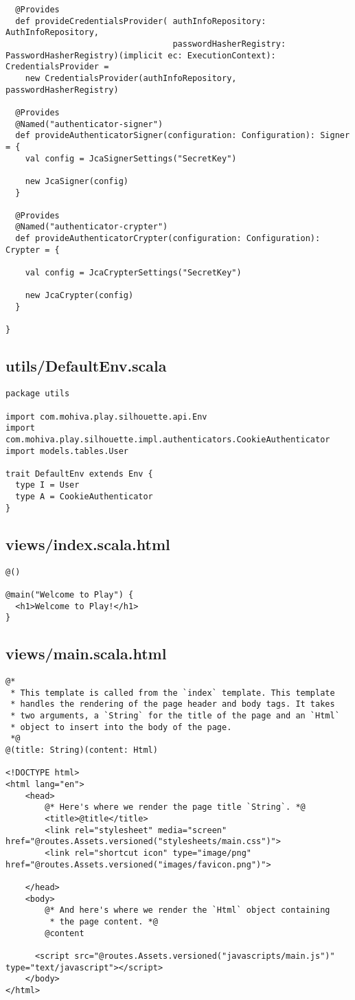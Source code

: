 \begin{lstlisting}
  @Provides
  def provideCredentialsProvider( authInfoRepository: AuthInfoRepository,
                                  passwordHasherRegistry: PasswordHasherRegistry)(implicit ec: ExecutionContext): CredentialsProvider =
    new CredentialsProvider(authInfoRepository, passwordHasherRegistry)

  @Provides
  @Named("authenticator-signer")
  def provideAuthenticatorSigner(configuration: Configuration): Signer = {
    val config = JcaSignerSettings("SecretKey")

    new JcaSigner(config)
  }

  @Provides
  @Named("authenticator-crypter")
  def provideAuthenticatorCrypter(configuration: Configuration): Crypter = {

    val config = JcaCrypterSettings("SecretKey")

    new JcaCrypter(config)
  }

}
\end{lstlisting}
\subsection{utils/DefaultEnv.scala}
\begin{lstlisting}
package utils

import com.mohiva.play.silhouette.api.Env
import com.mohiva.play.silhouette.impl.authenticators.CookieAuthenticator
import models.tables.User

trait DefaultEnv extends Env {
  type I = User
  type A = CookieAuthenticator
}
\end{lstlisting}
\subsection{views/index.scala.html}
\begin{lstlisting}
@()

@main("Welcome to Play") {
  <h1>Welcome to Play!</h1>
}
\end{lstlisting}
\subsection{views/main.scala.html}
\begin{lstlisting}
@*
 * This template is called from the `index` template. This template
 * handles the rendering of the page header and body tags. It takes
 * two arguments, a `String` for the title of the page and an `Html`
 * object to insert into the body of the page.
 *@
@(title: String)(content: Html)

<!DOCTYPE html>
<html lang="en">
    <head>
        @* Here's where we render the page title `String`. *@
        <title>@title</title>
        <link rel="stylesheet" media="screen" href="@routes.Assets.versioned("stylesheets/main.css")">
        <link rel="shortcut icon" type="image/png" href="@routes.Assets.versioned("images/favicon.png")">

    </head>
    <body>
        @* And here's where we render the `Html` object containing
         * the page content. *@
        @content

      <script src="@routes.Assets.versioned("javascripts/main.js")" type="text/javascript"></script>
    </body>
</html>
\end{lstlisting}
